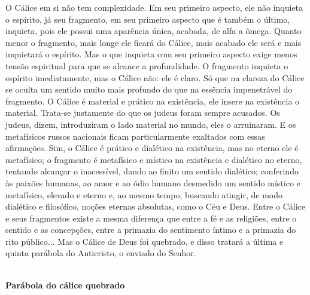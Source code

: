 O Cálice em si não tem complexidade. Em seu primeiro aspecto, ele não
inquieta o espírito, já seu fragmento, em seu primeiro aspecto que é
também o último, inquieta, pois ele possui uma aparência única, acabada,
de alfa a ômega. Quanto menor o fragmento, mais longe ele ficará do
Cálice, mais acabado ele será e mais inquietará o espírito. Mas o que
inquieta com seu primeiro aspecto exige menos tensão espiritual para que
se alcance a profundidade. O fragmento inquieta o espírito
imediatamente, mas o Cálice não: ele é claro. Só que na clareza do
Cálice se oculta um sentido muito mais profundo do que na essência
impenetrável do fragmento. O Cálice é material e prático na existência,
ele insere na existência o material. Trata-se justamente do que os
judeus foram sempre acusados. Os judeus, dizem, introduziram o lado
material no mundo, eles o arruinaram. E os metafísicos russos nacionais
ficam particularmente exaltados com essas afirmações. Sim, o Cálice é
prático e dialético na existência, mas no eterno ele é metafísico; o
fragmento é metafísico e místico na existência e dialético no eterno,
tentando alcançar o inacessível, dando ao finito um sentido dialético;
conferindo às paixões humanas, ao amor e ao ódio humano desmedido um
sentido místico e metafísico, elevado e eterno e, ao mesmo tempo,
buscando atingir, de modo dialético e filosófico, noções eternas
absolutas, como o Céu e Deus. Entre o Cálice e seus fragmentos existe a
mesma diferença que entre a fé e as religiões, entre o sentido e as
concepções, entre a primazia do sentimento íntimo e a primazia do rito
público... Mas o Cálice de Deus foi quebrado, e disso tratará a última e
quinta parábola do Anticristo, o enviado do Senhor.

\textbf{\\
Parábola do cálice quebrado}


